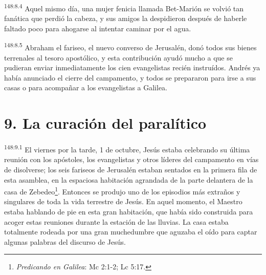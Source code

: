 \par 
\textsuperscript{148:8.4} Aquel mismo día, una mujer fenicia llamada Bet-Marión se volvió tan fanática que perdió la cabeza, y sus amigos la despidieron después de haberle faltado poco para ahogarse al intentar caminar por el agua.

\par 
\textsuperscript{148:8.5} Abraham el fariseo, el nuevo converso de Jerusalén, donó todos sus bienes terrenales al tesoro apostólico, y esta contribución ayudó mucho a que se pudieran enviar inmediatamente los cien evangelistas recién instruídos. Andrés ya había anunciado el cierre del campamento, y todos se prepararon para irse a sus casas o para acompañar a los evangelistas a Galilea.

\section*{9. La curación del paralítico}
\par 
\textsuperscript{148:9.1} El viernes por la tarde, 1 de octubre, Jesús estaba celebrando su última reunión con los apóstoles, los evangelistas y otros líderes del campamento en vías de disolverse; los seis fariseos de Jerusalén estaban sentados en la primera fila de esta asamblea, en la espaciosa habitación agrandada de la parte delantera de la casa de Zebedeo\footnote{\textit{Predicando en Galilea}: Mc 2:1-2; Lc 5:17.}. Entonces se produjo uno de los episodios más extraños y singulares de toda la vida terrestre de Jesús. En aquel momento, el Maestro estaba hablando de pie en esta gran habitación, que había sido construida para acoger estas reuniones durante la estación de las lluvias. La casa estaba totalmente rodeada por una gran muchedumbre que aguzaba el oído para captar algunas palabras del discurso de Jesús.

